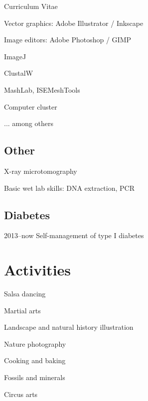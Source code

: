 \documentclass[11pt,a4paper]{article}
\begin{document}
\begin{cv}{Curriculum Vitae}
\begin{cvlist}{}
			\item Vector graphics: Adobe Illustrator / Inkscape
			\item Image editors: Adobe Photoshop / GIMP
			\item ImageJ
			\item ClustalW
			\item MashLab, ISEMeshTools
			\item Computer cluster
			\item ... among others
			
		\end{cvlist}
		
		\subsection{Other}
		
		\begin{cvlist}{}
			
			\item X-ray microtomography
			\item Basic wet lab skills: DNA extraction, PCR
			
		\end{cvlist}
	
		\subsection{Diabetes}
		
		\begin{cvlist}{}
			
			\item[2013--now] Self-management of type I diabetes
			
		\end{cvlist}
	
		\section{Activities}
		
		\begin{cvlist}{}
			
			\item Salsa dancing
			
			\item Martial arts
			
			\item Landscape and natural history illustration
			
			\item Nature photography
			
			\item Cooking and baking
			
			\item Fossils and minerals
			
			\item Circus arts
			
		\end{cvlist}
	
		
		\vfill
		\date{}
		
	\end{cv}
	
\end{document}
